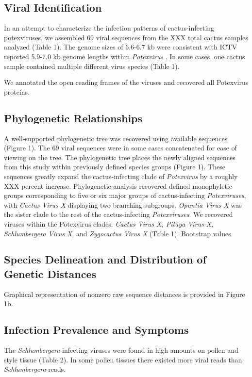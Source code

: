 \documentclass[fleqn,10pt,lineno]{wlpeerj}
\begin{document}
\subsection*{Viral Identification}
In an attempt to characterize the infection patterns of cactus-infecting potexviruses, we assembled 69 viral sequences from the XXX total cactus samples analyzed (Table 1).
The genome sizes of 6.6-6.7 kb were consistent with ICTV reported 5.9-7.0 kb genome lengths within \textit{Potexvirus} \citep{noauthor_genus_2020}.
In some cases, one cactus sample contained multiple different virus species (Table 1).

We annotated the open reading frames of the viruses and recovered all Potexvirus proteins.

\subsection*{Phylogenetic Relationships}
A well-supported phylogenetic tree was recovered using available sequences (Figure 1).
The 69 viral sequences were in some cases concatenated for ease of viewing on the tree.
The phylogenetic tree places the newly aligned sequences from this study within previously defined species groups (Figure 1).
These sequences greatly expand the cactus-infecting clade of \textit{Potexvirus} by a roughly XXX percent increase. 
Phylogenetic analysis recovered defined monophyletic groups corresponding to five or six major groups of cactus-infecting \textit{Potexviruses}, with \textit{Cactus Virus X} displaying two branching subgroups.
\textit{Opuntia Virus X} was the sister clade to the rest of the cactus-infecting \textit{Potexviruses}.
We recovered viruses within the Potexvirus clades: \textit{Cactus Virus X, Pitaya Virus X, Schlumbergera Virus X}, and \textit{Zygocactus Virus X} (Table 1).
Bootstrap values 

\subsection*{Species Delineation and Distribution of Genetic Distances}
Graphical representation of nonzero raw sequence distances is provided in Figure 1b. 

\subsection*{Infection Prevalence and Symptoms}
The \textit{Schlumbergera}-infecting viruses were found in high amounts on pollen and style tissue (Table 2).
In some pollen tissues there existed more viral reads than \textit{Schlumbergera} reads.
\end{document}
